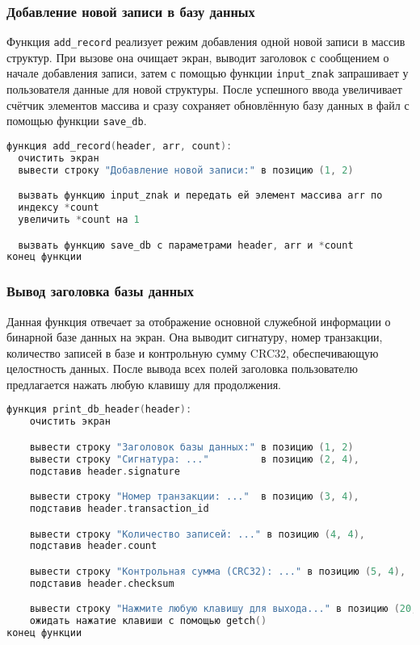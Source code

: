 \subsubsection*{Добавление новой записи в базу данных}

Функция \texttt{add\_record} реализует режим добавления одной новой записи в массив структур. При вызове она очищает экран, выводит заголовок с сообщением о начале добавления записи, затем с помощью функции \texttt{input\_znak} запрашивает у пользователя данные для новой структуры. После успешного ввода увеличивает счётчик элементов массива и сразу сохраняет обновлённую базу данных в файл с помощью функции \texttt{save\_db}.

\begin{lstlisting}[language=C, caption=Функция add\_record]
функция add_record(header, arr, count):
  очистить экран
  вывести строку "Добавление новой записи:" в позицию (1, 2)

  вызвать функцию input_znak и передать ей элемент массива arr по 
  индексу *count
  увеличить *count на 1

  вызвать функцию save_db с параметрами header, arr и *count
конец функции
\end{lstlisting}

\subsubsection*{Вывод заголовка базы данных}
Данная функция отвечает за отображение основной служебной информации о бинарной базе данных на экран. Она выводит сигнатуру, номер транзакции, количество записей в базе и контрольную сумму CRC32, обеспечивающую целостность данных. После вывода всех полей заголовка пользователю предлагается нажать любую клавишу для продолжения.

\begin{lstlisting}[language=C, caption=Функция print\_db\_header]
функция print_db_header(header):
    очистить экран

    вывести строку "Заголовок базы данных:" в позицию (1, 2)
    вывести строку "Сигнатура: ..."         в позицию (2, 4),
    подставив header.signature

    вывести строку "Номер транзакции: ..."  в позицию (3, 4), 
    подставив header.transaction_id

    вывести строку "Количество записей: ..." в позицию (4, 4), 
    подставив header.count

    вывести строку "Контрольная сумма (CRC32): ..." в позицию (5, 4),
    подставив header.checksum

    вывести строку "Нажмите любую клавишу для выхода..." в позицию (20, 2)
    ожидать нажатие клавиши с помощью getch()
конец функции

\end{lstlisting}

